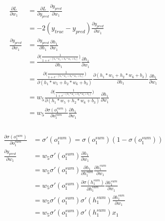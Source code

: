 \documentclass[a4paper,12pt]{article}
\begin{document}
\begin{equation*}
\begin{aligned}
\frac{\partial{L}}{\partial{w_1}} &= \frac{\partial{L}}{\partial{y_{pred}}}\frac{\partial{y_{pred}}}{\partial{w_1}} \\
                                  &= -2(y_{true} - y_{pred})\frac{\partial{y_{pred}}}{\partial{w_1}} \\[0.2cm]
\frac{\partial{y_{pred}}}{\partial{w_1}} &= \frac{\partial{y_{pred}}}{\partial{h_1}}\frac{\partial{h_1}}{\partial{w_1}} \\[0.2cm]
                                         &= \frac{\partial{\Big(\frac{1}{1 + e^{-(h_{1} * w_5 + h_{2} * w_6 + b_3)}}\Big)}}{\partial{h_1}}\frac{\partial{h_1}}{\partial{w_1}} \\[0.2cm]
                                         &= \frac{\partial{\Big(\frac{1}{1 + e^{-(h_{1} * w_5 + h_{2} * w_6 + b_3)}}\Big)}}{\partial{(h_{1} * w_5 + h_{2} * w_6 + b_3)}}\frac{\partial{(h_{1} * w_5 + h_{2} * w_6 + b_3)}}{\partial{h_1}}\frac{\partial{h_1}}{\partial{w_1}} \\[0.2cm]
                                         &= w_5\frac{\partial{\Big(\frac{1}{1 + e^{-(h_{1} * w_5 + h_{2} * w_6 + b_3)}}\Big)}}{\partial{(h_{1} * w_5 + h_{2} * w_6 + b_3)}}\frac{\partial{h_1}}{\partial{w_1}} \\[0.2cm]
                                         &= w_5\frac{\partial{\sigma(o^{sum}_{1})}}{\partial{o^{sum}_{1}}}\frac{\partial{h_1}}{\partial{w_1}} \\
\end{aligned}
\end{equation*}
\\[1cm]

\begin{equation*}
\begin{aligned}
\frac{\partial{\sigma(o^{sum}_{1})}}{\partial{o^{sum}_{1}}} &= \sigma'(o^{sum}_{1}) = \sigma(o^{sum}_{1})(1 - \sigma(o^{sum}_{1})) \\[0.3cm]
\frac{\partial{y_{pred}}}{\partial{w_1}} &= w_5\sigma'(o^{sum}_{1})\frac{\partial{h_1}}{\partial{w_1}} \\
                                         &= w_5\sigma'(o^{sum}_{1})\frac{\partial{h_1}}{\partial{h^{sum}_1}}\frac{\partial{h^{sum}_1}}{\partial{w_1}} \\
                                         &= w_5\sigma'(o^{sum}_{1})\frac{\partial{\sigma(h^{sum}_{1})}}{\partial{h^{sum}_1}}\frac{\partial{h^{sum}_1}}{\partial{w_1}} \\
                                         &= w_5\sigma'(o^{sum}_{1})\sigma'(h^{sum}_{1})\frac{\partial{h^{sum}_1}}{\partial{w_1}} \\
                                         &= w_5\sigma'(o^{sum}_{1})\sigma'(h^{sum}_{1})x_1 \\
\end{aligned}
\end{equation*}
\end{document}
